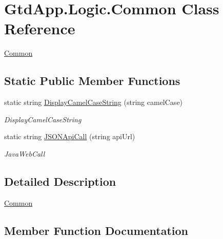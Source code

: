 \hypertarget{class_gtd_app_1_1_logic_1_1_common}{}\section{Gtd\+App.\+Logic.\+Common Class Reference}
\label{class_gtd_app_1_1_logic_1_1_common}


\mbox{\hyperlink{class_gtd_app_1_1_logic_1_1_common}{Common}}  


\subsection*{Static Public Member Functions}
\begin{DoxyCompactItemize}
\item 
static string \mbox{\hyperlink{class_gtd_app_1_1_logic_1_1_common_a320ebfc67d04f61144e28cef2c796f6d}{Display\+Camel\+Case\+String}} (string camel\+Case)
\begin{DoxyCompactList}\small\item\em Display\+Camel\+Case\+String \end{DoxyCompactList}\item 
static string \mbox{\hyperlink{class_gtd_app_1_1_logic_1_1_common_ad099da96a07128224d8f137fa366d693}{J\+S\+O\+N\+Api\+Call}} (string api\+Url)
\begin{DoxyCompactList}\small\item\em Java\+Web\+Call \end{DoxyCompactList}\end{DoxyCompactItemize}


\subsection{Detailed Description}
\mbox{\hyperlink{class_gtd_app_1_1_logic_1_1_common}{Common}} 



\subsection{Member Function Documentation}
\mbox{\label{class_gtd_app_1_1_logic_1_1_common_a320ebfc67d04f61144e28cef2c796f6d}} 
